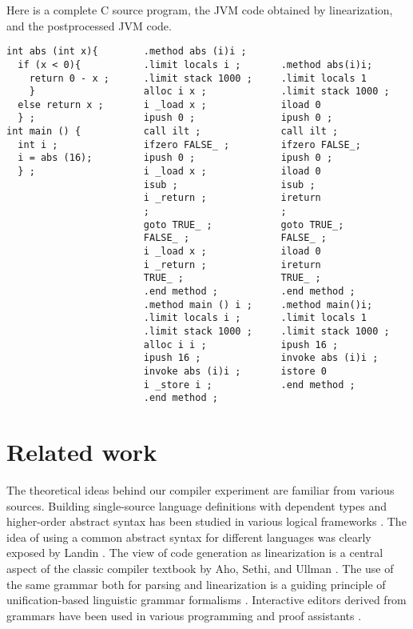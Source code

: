 \documentclass[12pt]{article}
\begin{document}
Here is a complete C source program, the JVM code obtained by linearization, and
the postprocessed JVM code.
\small
\begin{verbatim}
int abs (int x){        .method abs (i)i ;
  if (x < 0){           .limit locals i ;       .method abs(i)i;
    return 0 - x ;      .limit stack 1000 ;     .limit locals 1
    }                   alloc i x ;             .limit stack 1000 ;
  else return x ;       i _load x ;             iload 0
  } ;                   ipush 0 ;               ipush 0 ;
int main () {           call ilt ;              call ilt ;
  int i ;               ifzero FALSE_ ;         ifzero FALSE_;
  i = abs (16);         ipush 0 ;               ipush 0 ;
  } ;                   i _load x ;             iload 0
                        isub ;                  isub ;
                        i _return ;             ireturn
                        ;                       ;
                        goto TRUE_ ;            goto TRUE_;
                        FALSE_ ;                FALSE_ ;
                        i _load x ;             iload 0
                        i _return ;             ireturn
                        TRUE_ ;                 TRUE_ ;
                        .end method ;           .end method ;
                        .method main () i ;     .method main()i;
                        .limit locals i ;       .limit locals 1
                        .limit stack 1000 ;     .limit stack 1000 ;
                        alloc i i ;             ipush 16 ;
                        ipush 16 ;              invoke abs (i)i ;
                        invoke abs (i)i ;       istore 0
                        i _store i ;            .end method ;
                        .end method ;
\end{verbatim}
\normalsize



\section{Related work}

The theoretical ideas behind our compiler experiment
are familiar from various sources.
Building single-source language definitions with
dependent types and higher-order abstract syntax
has been studied in various logical frameworks 
\cite{harper-honsell,magnusson-nordstr,twelf}.
The idea of using a common abstract syntax for different 
languages was clearly exposed by Landin \cite{landin}. The view of
code generation as linearization is a central aspect of
the classic compiler textbook by Aho, Sethi, and Ullman
\cite{aho-ullman}. 
The use of the same grammar both for parsing and linearization
is a guiding principle of unification-based linguistic grammar 
formalisms \cite{pereira-shieber}. Interactive editors derived from
grammars have been used in various programming and proof
assistants \cite{teitelbaum,metal,magnusson-nordstr}.
\end{document}
